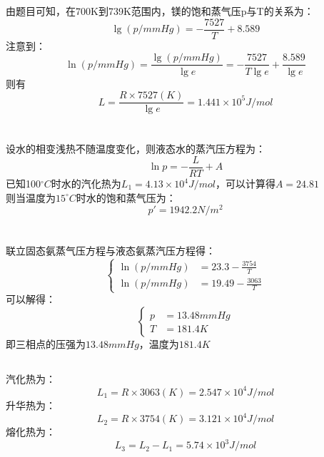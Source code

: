\documentclass[a4paper,12pt]{article}
\begin{document}
\section{}
由题目可知，在700K到739K范围内，镁的饱和蒸气压p与T的关系为：
\begin{equation}\nonumber
	\lg (p/mmHg) = -\frac{7527}{T} + 8.589
\end{equation}
注意到：
\begin{equation}\nonumber
	\ln (p/mmHg) = \frac{\lg (p/mmHg)}{\lg e} = -\frac{7527}{T \lg e} + \frac{8.589}{\lg e}
\end{equation}
则有
\begin{equation}\nonumber
	L = \frac{R \times 7527(K)}{\lg e} = 1.441\times 10^5 J/mol
\end{equation}


\section{}
设水的相变浅热不随温度变化，则液态水的蒸汽压方程为：
\begin{equation}\nonumber
	\ln p = -\frac{L}{RT} + A
\end{equation}
已知100$^{\circ}C$时水的汽化热为$L_1 = 4.13\times 10^4 J/mol$，可以计算得$A = 24.81$ \\
则当温度为$15^{\circ}C$时水的饱和蒸气压为：
\begin{equation}\nonumber
	p' = 1942.2 N/m^2
\end{equation}



\section{}
\subsection{}
联立固态氨蒸气压方程与液态氨蒸汽压方程得：
\begin{equation}\nonumber
\left\{\begin{aligned}
	\ln (p/mmHg) &= 23.3 - \frac{3754}{T} \\
	\ln (p/mmHg) &= 19.49 - \frac{3063}{T}
\end{aligned}\right.
\end{equation}
可以解得：
\begin{equation}\nonumber
\left\{\begin{aligned}
	p &=  13.48mmHg\\
	T &= 181.4K
\end{aligned}\right.
\end{equation}
即三相点的压强为$13.48mmHg$，温度为$181.4K$
\subsection{}
汽化热为：
\begin{equation}\nonumber
	L_1 = R \times 3063(K) = 2.547\times 10^4J/mol
\end{equation}
升华热为：
\begin{equation}\nonumber
	L_2 = R \times 3754(K) = 3.121\times 10^4 J/mol
\end{equation}
熔化热为：
\begin{equation}\nonumber
	L_3 = L_2 - L_1 = 5.74\times 10^3 J/mol
\end{equation}
\end{document}
